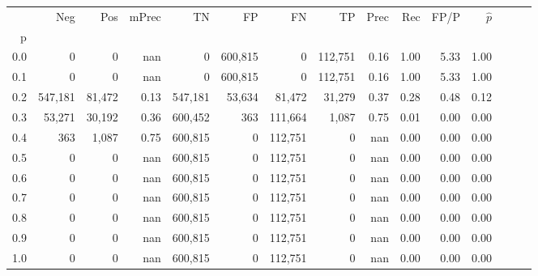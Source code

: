 \begin{tabular}{rrrrrrrrrrrrrrr}
\toprule
{} &      Neg &     Pos & mPrec &       TN &       FP &       FN &       TP &  Prec &   Rec &  FP/P & $\hat{p}$ \\
p   &          &         &       &          &          &          &          &       &       &       &           \\
\midrule
0.0 &        0 &       0 &   nan &        0 &  600,815 &        0 &  112,751 &  0.16 &  1.00 &  5.33 &      1.00 \\
0.1 &        0 &       0 &   nan &        0 &  600,815 &        0 &  112,751 &  0.16 &  1.00 &  5.33 &      1.00 \\
0.2 &  547,181 &  81,472 &  0.13 &  547,181 &   53,634 &   81,472 &   31,279 &  0.37 &  0.28 &  0.48 &      0.12 \\
0.3 &   53,271 &  30,192 &  0.36 &  600,452 &      363 &  111,664 &    1,087 &  0.75 &  0.01 &  0.00 &      0.00 \\
0.4 &      363 &   1,087 &  0.75 &  600,815 &        0 &  112,751 &        0 &   nan &  0.00 &  0.00 &      0.00 \\
0.5 &        0 &       0 &   nan &  600,815 &        0 &  112,751 &        0 &   nan &  0.00 &  0.00 &      0.00 \\
0.6 &        0 &       0 &   nan &  600,815 &        0 &  112,751 &        0 &   nan &  0.00 &  0.00 &      0.00 \\
0.7 &        0 &       0 &   nan &  600,815 &        0 &  112,751 &        0 &   nan &  0.00 &  0.00 &      0.00 \\
0.8 &        0 &       0 &   nan &  600,815 &        0 &  112,751 &        0 &   nan &  0.00 &  0.00 &      0.00 \\
0.9 &        0 &       0 &   nan &  600,815 &        0 &  112,751 &        0 &   nan &  0.00 &  0.00 &      0.00 \\
1.0 &        0 &       0 &   nan &  600,815 &        0 &  112,751 &        0 &   nan &  0.00 &  0.00 &      0.00 \\
\bottomrule
\end{tabular}
